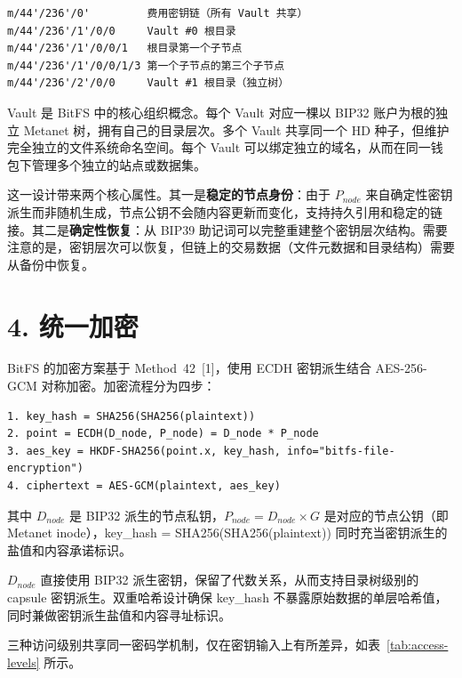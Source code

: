 \documentclass[11pt,a4paper]{article}
\begin{document}
\begin{lstlisting}
m/44'/236'/0'         费用密钥链（所有 Vault 共享）
m/44'/236'/1'/0/0     Vault #0 根目录
m/44'/236'/1'/0/0/1   根目录第一个子节点
m/44'/236'/1'/0/0/1/3 第一个子节点的第三个子节点
m/44'/236'/2'/0/0     Vault #1 根目录（独立树）
\end{lstlisting}

Vault 是 BitFS 中的核心组织概念。每个 Vault 对应一棵以 BIP32 账户为根的独立 Metanet 树，拥有自己的目录层次。多个 Vault 共享同一个 HD 种子，但维护完全独立的文件系统命名空间。每个 Vault 可以绑定独立的域名，从而在同一钱包下管理多个独立的站点或数据集。

这一设计带来两个核心属性。其一是\textbf{稳定的节点身份}：由于 $P_{node}$ 来自确定性密钥派生而非随机生成，节点公钥不会随内容更新而变化，支持持久引用和稳定的链接。其二是\textbf{确定性恢复}：从 BIP39 助记词可以完整重建整个密钥层次结构。需要注意的是，密钥层次可以恢复，但链上的交易数据（文件元数据和目录结构）需要从备份中恢复。

\section{4. 统一加密}

BitFS 的加密方案基于 Method~42~[1]，使用 ECDH 密钥派生结合 AES-256-GCM 对称加密。加密流程分为四步：

\begin{lstlisting}
1. key_hash = SHA256(SHA256(plaintext))
2. point = ECDH(D_node, P_node) = D_node * P_node
3. aes_key = HKDF-SHA256(point.x, key_hash, info="bitfs-file-encryption")
4. ciphertext = AES-GCM(plaintext, aes_key)
\end{lstlisting}

其中 $D_{node}$ 是 BIP32 派生的节点私钥，$P_{node} = D_{node} \times G$ 是对应的节点公钥（即 Metanet inode），key\_hash = SHA256(SHA256(plaintext)) 同时充当密钥派生的盐值和内容承诺标识。

$D_{node}$ 直接使用 BIP32 派生密钥，保留了代数关系，从而支持目录树级别的 capsule 密钥派生。双重哈希设计确保 key\_hash 不暴露原始数据的单层哈希值，同时兼做密钥派生盐值和内容寻址标识。

三种访问级别共享同一密码学机制，仅在密钥输入上有所差异，如表~\ref{tab:access-levels} 所示。
\end{document}
